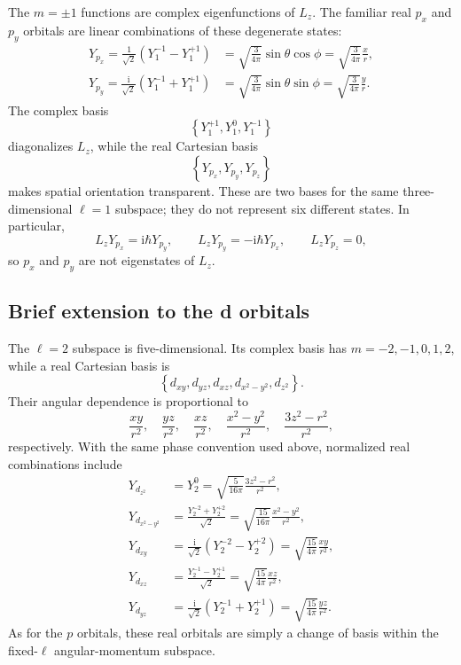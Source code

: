 \documentclass[11pt]{article}
\newcommand{\ii}{\mathrm{i}}
\begin{document}
The $m=\pm1$ functions are complex eigenfunctions of $L_z$.  The familiar real
$p_x$ and $p_y$ orbitals are linear combinations of these degenerate states:
\begin{align}
  \boxed{
  Y_{p_x}=\frac{1}{\sqrt{2}}\left(Y_1^{-1}-Y_1^{+1}\right)
  }
  &=\sqrt{\frac{3}{4\pi}}\sin\theta\cos\phi
   =\sqrt{\frac{3}{4\pi}}\frac{x}{r},\\[0.5em]
  \boxed{
  Y_{p_y}=\frac{\ii}{\sqrt{2}}\left(Y_1^{-1}+Y_1^{+1}\right)
  }
  &=\sqrt{\frac{3}{4\pi}}\sin\theta\sin\phi
   =\sqrt{\frac{3}{4\pi}}\frac{y}{r}.
\end{align}
The complex basis
\begin{equation}
  \left\{Y_1^{+1},Y_1^0,Y_1^{-1}\right\}
\end{equation}
diagonalizes $L_z$, while the real Cartesian basis
\begin{equation}
  \left\{Y_{p_x},Y_{p_y},Y_{p_z}\right\}
\end{equation}
makes spatial orientation transparent.  These are two bases for the same
three-dimensional $\ell=1$ subspace; they do not represent six different states.
In particular,
\begin{equation}
  L_zY_{p_x}=\ii\hbar Y_{p_y},
  \qquad
  L_zY_{p_y}=-\ii\hbar Y_{p_x},
  \qquad
  L_zY_{p_z}=0,
\end{equation}
so $p_x$ and $p_y$ are not eigenstates of $L_z$.

\clearpage
\subsection{Brief extension to the d orbitals}

The $\ell=2$ subspace is five-dimensional.  Its complex basis has
$m=-2,-1,0,1,2$, while a real Cartesian basis is
\begin{equation}
  \left\{d_{xy},d_{yz},d_{xz},d_{x^2-y^2},d_{z^2}\right\}.
\end{equation}
Their angular dependence is proportional to
\begin{equation}
  \frac{xy}{r^2},\quad
  \frac{yz}{r^2},\quad
  \frac{xz}{r^2},\quad
  \frac{x^2-y^2}{r^2},\quad
  \frac{3z^2-r^2}{r^2},
\end{equation}
respectively.  With the same phase convention used above, normalized real
combinations include
\begin{align}
  Y_{d_{z^2}}&=Y_2^0
  =\sqrt{\frac{5}{16\pi}}\frac{3z^2-r^2}{r^2},\\
  Y_{d_{x^2-y^2}}&=\frac{Y_2^{-2}+Y_2^{+2}}{\sqrt{2}}
  =\sqrt{\frac{15}{16\pi}}\frac{x^2-y^2}{r^2},\\
  Y_{d_{xy}}&=\frac{\ii}{\sqrt{2}}\left(Y_2^{-2}-Y_2^{+2}\right)
  =\sqrt{\frac{15}{4\pi}}\frac{xy}{r^2},\\
  Y_{d_{xz}}&=\frac{Y_2^{-1}-Y_2^{+1}}{\sqrt{2}}
  =\sqrt{\frac{15}{4\pi}}\frac{xz}{r^2},\\
  Y_{d_{yz}}&=\frac{\ii}{\sqrt{2}}\left(Y_2^{-1}+Y_2^{+1}\right)
  =\sqrt{\frac{15}{4\pi}}\frac{yz}{r^2}.
\end{align}
As for the $p$ orbitals, these real orbitals are simply a change of basis within
the fixed-$\ell$ angular-momentum subspace.
\end{document}

